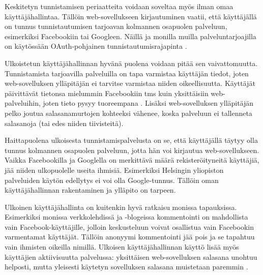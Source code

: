 Keskitetyn tunnistamisen periaatteita voidaan soveltaa myös ilman omaa käyttäjähallintaa. Tällöin web-sovellukseen kirjautuminen vaatii, että käyttäjällä on tunnus tunnistautumisen tarjoavan kolmannen osapuolen palveluun, esimerkiksi Facebookiin tai Googleen. Näillä ja monilla muilla palveluntarjoajilla on käytössään OAuth-pohjainen tunnistautumisrajapinta \cite{inside_the_identity_management_game}.

Ulkoistetun käyttäjähallinnan hyvänä puolena voidaan pitää sen vaivattomuutta. Tunnistamista tarjoavilla palveluilla on tapa varmistaa käyttäjän tiedot, joten web-sovelluksen ylläpitäjän ei tarvitse varmistaa niiden oikeellisuutta. Käyttäjät päivittävät tietonsa mielummin Facebookiin tms kuin yksittäisiin web-palveluihin, joten tieto pysyy tuoreempana \cite{inside_the_identity_management_game}. Lisäksi web-sovelluksen ylläpitäjän pelko joutua salasanamurtojen kohteeksi vähenee, koska palveluun ei tallenneta salasanoja (tai edes niiden tiivisteitä).

Haittapuolena ulkoisesta tunnistamispalvelusta on se, että käyttäjällä täytyy olla tunnus kolmannen osapuolen palveluun, jotta hän voi kirjautua web-sovellukseen. Vaikka Facebookilla ja Googlella on merkittävä määrä rekisteröityneitä käyttäjiä, jää niiden ulkopuolelle useita ihmisiä. Esimerkiksi Helsingin yliopiston palveluiden käytön edellytys ei voi olla Google-tunnus. Tällöin oman käyttäjähallinnan rakentaminen ja ylläpito on tarpeen.

Ulkoinen käyttäjähallinta on kuitenkin hyvä ratkaisu monissa tapauksissa. Esimerkiksi monissa verkkolehdissä ja -blogeissa kommentointi on mahdollista vain Fa\-ce\-book-käyt\-tä\-jil\-le, jolloin keskusteluun voivat osallistua vain Facebookin varmentamat käyttäjät. Tällöin anonyymi kommentointi jää pois ja se tapahtuu vain ihmisten oikeilla nimillä. Ulkoisen käyttäjähallinnan käyttö lisää myös käyttäjien aktiivisuutta palvelussa: yksittäisen web-sovelluksen salasana unohtuu helposti, mutta yleisesti käytetyn sovelluksen salasana muistetaan paremmin \cite{password_habits}.